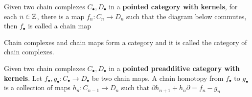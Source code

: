 \documentclass{article}
\begin{document}
\begin{definition}
    Given two chain complexes $C_\bullet, D_\bullet$ in a \textbf{pointed category with kernels}, for each $n \in \mathbb{Z}$, there is a map $f_n: C_n \to D_n$ such that the diagram below commutes, then $f_\bullet$ is called a chain map
    \begin{center}
    \end{center}

    Chain complexes and chain maps form a category and it is called the category of chain complexes.

    Given two chain complexes $C_\bullet, D_\bullet$ in a \textbf{pointed preadditive category with kernels}. Let $f_\bullet, g_\bullet: C_\bullet \to D_\bullet$ be two chain maps. A chain homotopy from $f_\bullet$ to $g_\bullet$ is a collection of maps $h_n: C_{n-1} \to D_n$ such that $\partial h_{n+1} + h_n \partial = f_n - g_n$

    \begin{center}
    \end{center}
    
    
\end{definition}
\end{document}
